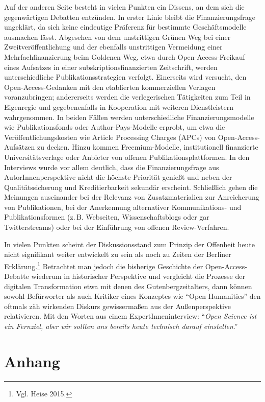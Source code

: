 \documentclass[a4paper,
fontsize=11pt,
oneside,
numbers=noperiodatend,
parskip=half-,
bibliography=totoc,
final
]{scrartcl}
\begin{document}
Auf der anderen Seite besteht in vielen Punkten ein Dissens, an dem sich
die gegenwärtigen Debatten entzünden. In erster Linie bleibt die
Finanzierungsfrage ungeklärt, da sich keine eindeutige Präferenz für
bestimmte Geschäftsmodelle ausmachen lässt. Abgesehen von dem
unstrittigen Grünen Weg bei einer Zweitveröffentlichung und der
ebenfalls unstrittigen Vermeidung einer Mehrfachfinanzierung beim
Goldenen Weg, etwa durch Open-Access-Freikauf eines Aufsatzes in einer
subskriptionsfinanzierten Zeitschrift, werden unterschiedliche
Publikationsstrategien verfolgt. Einerseits wird versucht, den
Open-Access-Gedanken mit den etablierten kommerziellen Verlagen
voranzubringen; andererseits werden die verlegerischen Tätigkeiten zum
Teil in Eigenregie und gegebenenfalls in Kooperation mit weiteren
Dienstleistern wahrgenommen. In beiden Fällen werden unterschiedliche
Finanzierungsmodelle wie Publikationsfonds oder Author-Pays-Modelle
erprobt, um etwa die Veröffentlichungskosten wie Article Processing
Charges (APCs) von Open-Access-Aufsätzen zu decken. Hinzu kommen
Freemium-Modelle, institutionell finanzierte Universitätsverlage oder
Anbieter von offenen Publikationsplattformen. In den Interviews wurde
vor allem deutlich, dass die Finanzierungsfrage aus
AutorInnenperspektive nicht die höchste Priorität genießt und neben der
Qualitätssicherung und Kreditierbarkeit sekundär erscheint. Schließlich
gehen die Meinungen auseinander bei der Relevanz von Zusatzmaterialien
zur Anreicherung von Publikationen, bei der Anerkennung alternativer
Kommunikations- und Publikationsformen (z.\,B. Webseiten,
Wissenschaftsblogs oder gar Twitterstreams) oder bei der Einführung von
offenen Review-Verfahren.

In vielen Punkten scheint der Diskussionsstand zum Prinzip der Offenheit
heute nicht signifikant weiter entwickelt zu sein als noch zu Zeiten der
Berliner Erklärung.\footnote{Vgl. Heise 2015.} Betrachtet man jedoch die
bisherige Geschichte der Open-Access-Debatte wiederum in historischer
Perspektive und vergleicht die Prozesse der digitalen Transformation
etwa mit denen des Gutenbergzeitalters, dann können sowohl Befürworter
als auch Kritiker eines Konzeptes wie \enquote{Open Humanities} den
oftmals zäh wirkenden Diskurs gewissermaßen aus der Außenperspektive
relativieren. Mit den Worten aus einem ExpertInneninterview:
\enquote{\emph{Open Science ist ein Fernziel, aber wir sollten uns
bereits heute technisch darauf einstellen}.}

\section{Anhang}\label{anhang}
\end{document}
